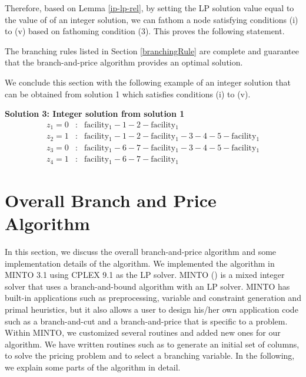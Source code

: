 Therefore, based on Lemma \ref{ip-lp-rel}, by setting the LP solution value equal 
to the value of of an integer solution, we can fathom a node satisfying conditions 
(i) to (v) based  on fathoming condition (3). This proves the following statement.

\begin{prop} The branching rules listed in Section \ref{branchingRule} 
are complete and guarantee that the branch-and-price algorithm provides
an optimal solution.
\end{prop} 

We conclude this section with the following example of an integer solution 
that can be obtained from solution 1 which satisfies conditions (i) to (v).    
\begin{example}
{\bf Solution 3: Integer solution from solution 1}
\begin{eqnarray*}
  z_1 = 0 &: & \mbox{facility$_1$} - 1 - 2 - \mbox{facility$_1$} \\ 
  z_2 = 1 &: & \mbox{facility$_1$} - 1 - 2 - \mbox{facility$_1$} - 3 - 4 - 5 - \mbox{facility$_1$}\\
  z_3 = 0 &: & \mbox{facility$_1$} - 6 - 7 - \mbox{facility$_1$} - 3 - 4 - 5 - \mbox{facility$_1$} \\
  z_4 = 1 &: & \mbox{facility$_1$} - 6 - 7 - \mbox{facility$_1$}
\end{eqnarray*}
\end{example}

 

\section{Overall Branch and Price Algorithm}
\label{sec:BP-overview}

In this section, we discuss the overall branch-and-price algorithm
and some implementation details of the algorithm.  We implemented
the algorithm in MINTO 3.1 using CPLEX 9.1 as the LP solver.
MINTO (\citet{Savelsbergh2}) is a mixed integer solver that uses a 
branch-and-bound algorithm with an LP solver. MINTO has built-in applications 
such as preprocessing, variable and constraint generation and primal heuristics, 
but it also allows a user to design his/her own application code such as 
a branch-and-cut and a branch-and-price that is specific to a problem. 
Within MINTO, we customized several routines and added new ones for our algorithm.
We have written routines such as to generate an initial set of columns, to solve 
the pricing problem and to select a branching variable. In the following,
we explain some parts of the algorithm in detail. 


